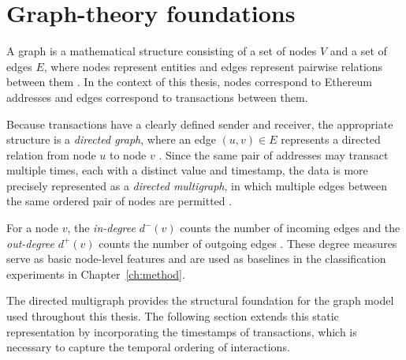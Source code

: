 \section{Graph-theory foundations}
\label{sec:graph}

A graph is a mathematical structure consisting of a set of nodes $V$ and a set 
of edges $E$, where nodes represent entities and edges represent pairwise 
relations between them \citep{newman2010networks}. In the context of this
thesis, nodes correspond to Ethereum addresses and edges correspond to 
transactions between them.

Because transactions have a clearly defined sender and receiver, the 
appropriate structure is a \emph{directed graph}, where an edge $(u, v) \in E$ 
represents a directed relation from node $u$ to node $v$ 
\citep{newman2010networks}. Since the same pair of addresses may transact
multiple times, each with a distinct value and timestamp, the data is more 
precisely represented as a \emph{directed multigraph}, in which multiple edges 
between the same ordered pair of nodes are permitted 
\citep{paranjape2017motifs, sanjalawe2023atd}.

For a node $v$, the \emph{in-degree} $d^-(v)$ counts the number of incoming 
edges and the \emph{out-degree} $d^+(v)$ counts the number of outgoing edges 
\citep{newman2010networks}. These degree measures serve as basic node-level
features and are used as baselines in the classification experiments in 
Chapter~\ref{ch:method}.

The directed multigraph provides the structural foundation for the graph model 
used throughout this thesis. The following section extends this static 
representation by incorporating the timestamps of transactions, which is 
necessary to capture the temporal ordering of interactions.

